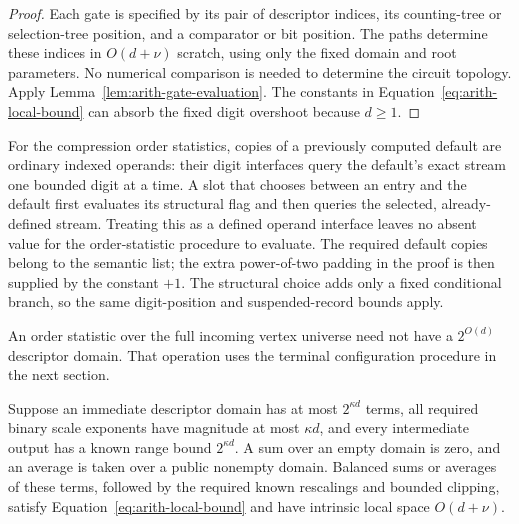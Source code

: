 \begin{proof}
Each gate is specified by its pair of descriptor indices, its
counting-tree or selection-tree position, and a comparator or bit
position.  The paths determine these indices in $O(d+\nu)$ scratch,
using only the fixed domain and root parameters.  No numerical
comparison is needed to determine the circuit topology.  Apply
Lemma~\ref{lem:arith-gate-evaluation}.  The constants in
Equation~\eqref{eq:arith-local-bound} can absorb the fixed digit
overshoot because $d\geq1$.
\end{proof}

For the compression order statistics, copies of a previously computed default
are ordinary indexed operands: their digit interfaces query the
default's exact stream one bounded digit at a time.  A slot that
chooses between an entry and the default first evaluates its
structural flag and then queries the selected, already-defined stream.
Treating this as a defined operand interface leaves no absent value
for the order-statistic procedure to evaluate.
The required default copies belong to the semantic list; the extra
power-of-two padding in the proof is then supplied by the constant
$+1$.  The structural choice adds only a fixed conditional branch,
so the same digit-position and suspended-record bounds apply.

An order statistic over the full incoming vertex universe need not have a
$2^{O(d)}$ descriptor domain.  That operation uses the terminal
configuration procedure in the next section.

\begin{lemma}
\label{lem:arith-sums-scales}
Suppose an immediate descriptor domain has at most $2^{\kappa d}$
terms, all required binary scale exponents have magnitude at most
$\kappa d$, and every intermediate output has a known range bound
$2^{\kappa d}$.  A sum over an empty domain is zero, and an average
is taken over a public nonempty domain.  Balanced sums or averages of these terms, followed
by the required known rescalings and bounded clipping, satisfy
Equation~\eqref{eq:arith-local-bound} and have intrinsic local
space $O(d+\nu)$.
\end{lemma}

